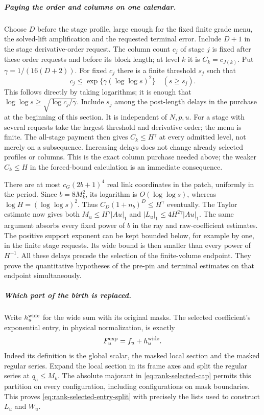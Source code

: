 \subparagraph{Paying the order and columns on one calendar.}
Choose $D$ before the stage profile, large enough for the fixed finite
grade menu, the solved-lift amplification and the requested terminal
error. Include $D+1$ in the stage derivative-order request. The column
count $c_j$ of stage $j$ is fixed after these order requests and before
its block length; at level $k$ it is $C_k=c_{J(k)}$. Put
$\gamma=1/(16(D+2))$. For fixed $c_j$ there is a finite threshold
$s_j$ such that
\[
 c_j\le \exp\{\gamma(\log\log s)^2\}\quad(s\ge s_j).
\]
This follows directly by taking logarithms; it is enough that
$\log\log s\ge\sqrt{\log c_j/\gamma}$. Include $s_j$ among the
post-length delays in the purchase at the beginning of this section.
It is independent of $N,p,u$. For a stage with several requests take
the largest threshold and derivative order; the menu is finite.
The all-stage payment then gives $C_k\le H^\gamma$ at every admitted
level, not merely on a subsequence. Increasing delays does not change
already selected profiles or columns. This is the exact column purchase
needed above; the weaker $C_k\le H$ in the forced-bound calculation
is an immediate consequence.

There are at most $c_G(2b+1)^4$ real link coordinates in the patch,
uniformly in the period. Since $b=8M_k^2$, its logarithm is
$O(\log\log s)$, whereas $\log H=(\log\log s)^2$.
Thus $C_D(1+n_b)^D\le H^\gamma$ eventually. The Taylor estimate
now gives both $M_u\le H^\gamma|Au|_1$ and
$|L_u|_1\le4H^{2\gamma}|Au|_1$. The same argument absorbs every
fixed power of $b$ in the ray and raw-coefficient estimates.
The positive support exponent can be kept bounded below, for example
by one, in the finite stage requests. Its wide bound is then smaller
than every power of $H^{-1}$. All these delays precede the selection
of the finite-volume endpoint. They prove the quantitative hypotheses
of the pre-pin and terminal estimates on that endpoint simultaneously.

\subparagraph{Which part of the birth is replaced.}
Write $h_u^{\rm wide}$ for the wide sum with its original masks.
The selected coefficient's exponential entry, in physical normalization,
is exactly
\begin{equation}\label{eq:rank-selected-entry-split}
 F_u^{\rm exp}=f_u+h_u^{\rm wide}.
\end{equation}
Indeed its definition is the global scalar, the masked local section
and the masked regular series. Expand the local section in its frame
axes and split the regular series at $q_a\le M_k$. The absolute
majorant in \eqref{eq:rank-selected-cap} permits this partition on
every configuration, including configurations on mask boundaries.
This proves \eqref{eq:rank-selected-entry-split} with precisely the
lists used to construct $L_u$ and $W_u$.

